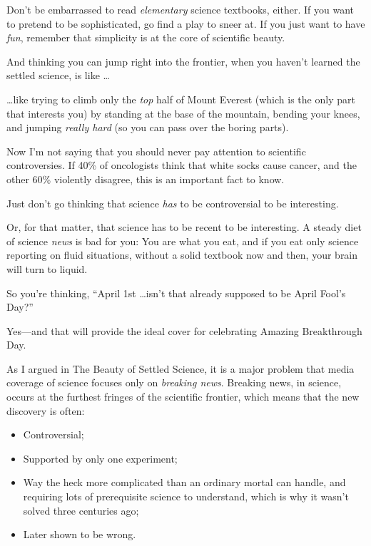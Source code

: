 {
 Don't be embarrassed to read \textit{elementary}
science textbooks, either. If you want to pretend to be sophisticated,
go find a play to sneer at. If you just want to have \textit{fun},
remember that simplicity is at the core of scientific beauty.}

{
 And thinking you can jump right into the frontier, when you
haven't learned the settled science, is like \ldots}

{
 \ldots like trying to climb only the \textit{top} half of Mount
Everest (which is the only part that interests you) by standing at the
base of the mountain, bending your knees, and jumping \textit{really
hard} (so you can pass over the boring parts).}

{
 Now I'm not saying that you should never pay
attention to scientific controversies. If 40\% of oncologists think
that white socks cause cancer, and the other 60\% violently disagree,
this is an important fact to know.}

{
 Just don't go thinking that science \textit{has}
to be controversial to be interesting.}

{
 Or, for that matter, that science has to be recent to be
interesting. A steady diet of science \textit{news} is bad for you: You
are what you eat, and if you eat only science reporting on fluid
situations, without a solid textbook now and then, your brain will turn
to liquid.}

\myendsectiontext


{
 So you're thinking, ``April 1st
\ldots isn't that already supposed to be April
Fool's Day?'' }

{
 Yes---and that will provide the ideal cover for celebrating
Amazing Breakthrough Day.}

{
 As I argued in The Beauty of Settled Science, it is a major
problem that media coverage of science focuses only on \textit{breaking
news}. Breaking news, in science, occurs at the furthest fringes of the
scientific frontier, which means that the new discovery is often:}

\begin{itemize}
\item  Controversial;
\item  Supported by only one experiment;
\item  Way the heck more complicated than an ordinary mortal can handle,
and requiring lots of prerequisite science to understand, which is why
it wasn't solved three centuries ago;
\item  Later shown to be wrong.
\end{itemize}

